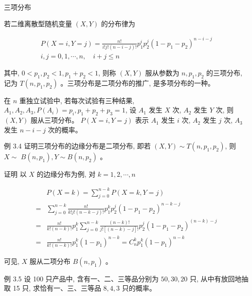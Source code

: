 \documentclass{beamer}
\begin{document}
	\begin{frame}
		三项分布
		
		若二维离散型随机变量 $(X, Y)$ 的分布律为
		
		$$
		\begin{gathered}
			P(X=i, Y=j)=\frac{n !}{i ! j !(n-i-j) !} p_{1}^{i} p_{2}^{j}\left(1-p_{1}-p_{2}\right)^{n-i-j} \\
			i, j=0,1, \cdots, n, \quad i+j \leqslant n
		\end{gathered}
		$$
		
		其中, $0<p_{1}, p_{2}<1, p_{1}+p_{2}<1$, 则称 $(X, Y)$ 服从参数为 $n, p_{1}, p_{2}$ 的三项分布, 记为 $T\left(n, p_{1}, p_{2}\right)$ 。三项分布是二项分布的推广, 是多项分布的一种。
		
		在 $n$ 重独立试验中, 若每次试验有三种结果, $A_{1}, A_{2}, A_{3}, P\left(A_{i}\right)=p_{i}, p_{1}+p_{2}+p_{3}=1$, 设 $A_{1}$ 发生 $X$ 次, $A_{2}$ 发生 $Y$ 次, 则 $(X, Y)$ 服从三项分布。 $P(X=i, Y=j)$ 表示 $A_{1}$ 发生 $i$ 次, $A_{2}$ 发生 $j$ 次, $A_{3}$ 发生 $n-i-j$ 次的概率。
	\end{frame}
	
	\begin{frame}
		例 3.4 证明三项分布的边缘分布是二项分布, 即若 $(X, Y) \sim T\left(n, p_{1}, p_{2}\right)$, 则 $X \sim$ $B\left(n, p_{1}\right), Y \sim B\left(n, p_{2}\right)$ 。
	\end{frame}
	
	\begin{frame}
		证明 以 $X$ 的边缘分布为例, 对 $k=1,2, \cdots, n$
		
		$$
		\begin{aligned}
			& P(X=k)=\sum_{j=0}^{n-k} P(X=k, Y=j) \\
			= & \sum_{j=0}^{n-k} \frac{n !}{k ! j !(n-k-j) !} p_{1}^{k} p_{2}^{j}\left(1-p_{1}-p_{2}\right)^{n-k-j} \\
			= & \frac{n !}{k !(n-k) !} p_{1}^{k} \sum_{j=0}^{n-k} \frac{(n-k) !}{j ![(n-k)-j] !} p_{2}^{j}\left(1-p_{1}-p_{2}\right)^{(n-k)-j} \\
			= & \frac{n !}{k !(n-k) !} p_{1}^{k}\left(1-p_{1}\right)^{n-k}=C_{n}^{k} p_{1}^{k}\left(1-p_{1}\right)^{n-k}
		\end{aligned}
		$$
		
		可见, $X$ 服从二项分布 $B\left(n, p_{1}\right)$ 。
	\end{frame}
		
	\begin{frame}
		例 3.5 设 100 只产品中, 含有一、二、三等品分别为 $50,30,20$ 只, 从中有放回地抽 取 15 只, 求恰有一、三、三等品 $8,4,3$ 只的概率。
	\end{frame}
	
\end{document}
